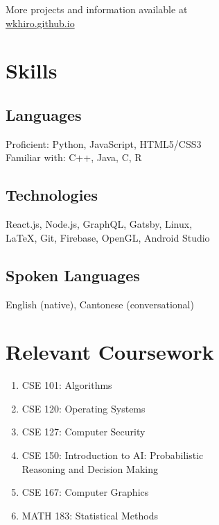 \documentclass{article}
\begin{document}
\begin{paracol}{2}
\vspace{0.5em}
{\noindent More projects and information available at \\
\href{https://wkhiro.github.io/}{\color{NavyBlue} wkhiro.github.io}}

\switchcolumn
\vspace{-2.5em}
\section{Skills}

\vspace{-0.5em}
\subsection{Languages} \hfill
	
	Proficient: Python, JavaScript, HTML5/CSS3\\
	\indent Familiar with: C++, Java, C, R
\vspace{-0.5em}
\subsection{Technologies} \hfill

	React.js, Node.js, GraphQL, Gatsby, Linux, \\\indent LaTeX, Git, Firebase, OpenGL, Android Studio
	
\vspace{-0.5em}
\subsection{Spoken Languages} \hfill

	English (native), Cantonese (conversational)
	
\section{Relevant Coursework}
\begin{enumerate}[leftmargin=0cm]
	\item[] CSE 101: Algorithms
	\item[] CSE 120: Operating Systems
	\item[] CSE 127: Computer Security
	\item[] CSE 150: Introduction to AI: Probabilistic\\Reasoning and Decision Making 
	\item[] CSE 167: Computer Graphics
	\item[] MATH 183: Statistical Methods
\end{enumerate}

\end{paracol}
\end{document}
